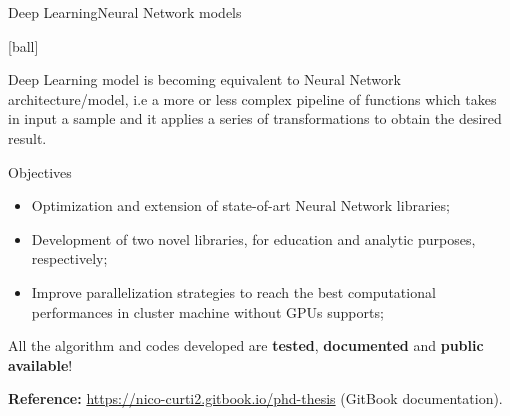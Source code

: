 \documentclass[10pt, technote, oribibl, unicode]{beamer}
\begin{document}
\begin{frame}{Deep Learning}{Neural Network models}

  [ball]

  \scriptsize{Deep Learning model is becoming equivalent to Neural Network architecture/model, i.e a more or less complex pipeline of functions which takes in input a sample and it applies a series of transformations to obtain the desired result.}

  \begin{block}{Objectives}
    \begin{itemize}

      \item Optimization and extension of state-of-art Neural Network libraries;

      \item  Development of two novel libraries, for education and analytic purposes, respectively;

      \item Improve parallelization strategies to reach the best computational performances in cluster machine without GPUs supports;

    \end{itemize}

  \end{block}

  \begin{alertblock}{}
    All the algorithm and codes developed are \textbf{tested}, \textbf{documented} and \textbf{public available}!

    \quad

    \textbf{Reference:} \url{https://nico-curti2.gitbook.io/phd-thesis} (GitBook documentation).
  \end{alertblock}

\end{frame}


\end{document}
